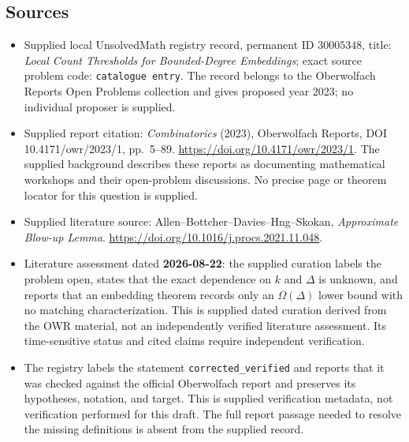 \documentclass[11pt]{article}
\begin{document}
\subsection{Sources}
\begin{itemize}
\item Supplied local UnsolvedMath registry record, permanent ID \(30005348\), title: \emph{Local Count Thresholds for Bounded-Degree Embeddings}; exact source problem code: \texttt{catalogue entry}. The record belongs to the Oberwolfach Reports Open Problems collection and gives proposed year 2023; no individual proposer is supplied.
\item Supplied report citation: \emph{Combinatorics} (2023), Oberwolfach Reports, DOI 10.4171/owr/2023/1, pp.\ 5--89. \url{https://doi.org/10.4171/owr/2023/1}. The supplied background describes these reports as documenting mathematical workshops and their open-problem discussions. No precise page or theorem locator for this question is supplied.
\item Supplied literature source: Allen--Bottcher--Davies--Hng--Skokan, \emph{Approximate Blow-up Lemma}. \url{https://doi.org/10.1016/j.procs.2021.11.048}.
\item Literature assessment dated \textbf{2026-08-22}: the supplied curation labels the problem open, states that the exact dependence on \(k\) and \(\Delta\) is unknown, and reports that an embedding theorem records only an \(\Omega(\Delta)\) lower bound with no matching characterization. This is supplied dated curation derived from the OWR material, not an independently verified literature assessment. Its time-sensitive status and cited claims require independent verification.
\item The registry labels the statement \texttt{corrected\_verified} and reports that it was checked against the official Oberwolfach report and preserves its hypotheses, notation, and target. This is supplied verification metadata, not verification performed for this draft. The full report passage needed to resolve the missing definitions is absent from the supplied record.
\end{itemize}
\end{document}
